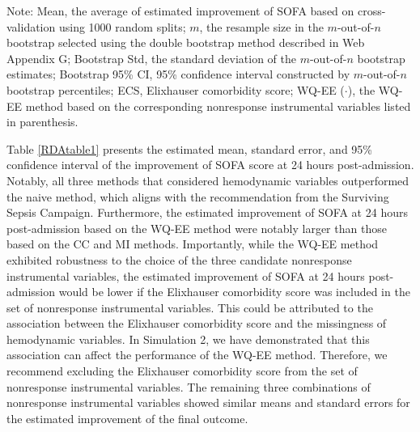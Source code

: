 \documentclass[12pt]{article}
\begin{document}
\begin{table}[htbp]
\begin{threeparttable}
\begin{tabular}{llccc}
    \hline
    \end{tabular}%
\begin{tablenotes}
    \small
    \item Note: 
    Mean, the average of estimated improvement  of SOFA based on cross-validation using 1000 random splits;
    $m$, the  resample size in the $m$-out-of-$n$ bootstrap selected using the double bootstrap method described in Web Appendix G;
    Bootstrap Std, the standard deviation of the $m$-out-of-$n$ bootstrap estimates;
    Bootstrap 95\% CI, 95\% confidence interval constructed by $m$-out-of-$n$ bootstrap percentiles;
    ECS, Elixhauser comorbidity score; WQ-EE ($\cdot$), the WQ-EE method based on the corresponding nonresponse instrumental variables listed in parenthesis.
\end{tablenotes}
    \end{threeparttable}
\end{table}%



Table \ref{RDAtable1} presents the estimated mean, standard error, and 95\% confidence interval of the improvement of SOFA score at 24 hours post-admission. Notably, all three methods that considered hemodynamic variables outperformed the naive method, which aligns with the recommendation from the Surviving Sepsis Campaign.
Furthermore, the estimated improvement of SOFA at 24 hours post-admission based on the WQ-EE method were notably larger than those based on the CC and MI methods. Importantly, while the WQ-EE method exhibited robustness to the choice of the three candidate nonresponse instrumental variables, the estimated improvement of SOFA at 24 hours post-admission would be lower if the Elixhauser comorbidity score was included in the set of  nonresponse instrumental variables. This could be attributed to the association between the Elixhauser comorbidity score and the missingness of hemodynamic variables. In Simulation 2, we have demonstrated that this association can affect the performance of the WQ-EE method. Therefore, we recommend excluding the Elixhauser comorbidity score from the set of nonresponse instrumental variables. The remaining three combinations of nonresponse instrumental variables showed similar means and standard errors for the estimated improvement of the final outcome. %
\end{document}
